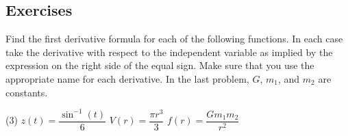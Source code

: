 \documentclass[10pt,oneside,]{book}
\theoremstyle{plain}
\theoremstyle{definition}
\numberwithin{equation}{section}
\newcommand{\fe}[2]{#1\mathopen{}\left(#2\right)\mathclose{}}
\begin{document}
\subsection[Exercises]{Exercises}\label{exercises-35}
\hypertarget{exercisegroup-74}{\null}Find the first derivative formula for each of the following functions.  In each case take the derivative with respect to the independent variable as implied by the expression on the right side of the equal sign.  Make sure that you use the appropriate name for each derivative. In the last problem, \(G\), \(m_1\), and \(m_2\) are constants.%
\par
\begin{exercisegroup}(3)
\exercise[1.]\hypertarget{exercise-363}{\null}\(\fe{z}{t}=\dfrac{\fe{\sin^{-1}}{t}}{6}\)%
\exercise[2.]\hypertarget{exercise-364}{\null}\(\fe{V}{r}=\dfrac{\pi r^3}{3}\)%
\exercise[3.]\hypertarget{exercise-365}{\null}\(\fe{f}{r}=\dfrac{Gm_1m_2}{r^2}\)%
\end{exercisegroup}
\par\smallskip\noindent
\typeout{************************************************}
\typeout{************************************************}
\end{document}
